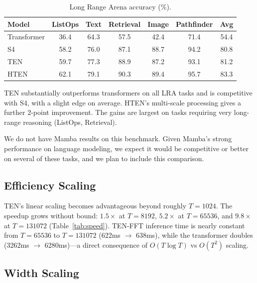 \documentclass{article}
\begin{document}
\begin{table}[h]
\centering
\caption{Long Range Arena accuracy (\%).}
\label{tab:lra}
\begin{tabular}{lcccccc}
\toprule
Model & ListOps & Text & Retrieval & Image & Pathfinder & Avg \\
\midrule
Transformer & 36.4 & 64.3 & 57.5 & 42.4 & 71.4 & 54.4 \\
S4 & 58.2 & 76.0 & 87.1 & 88.7 & 94.2 & 80.8 \\
TEN & 59.7 & 77.3 & 88.9 & 87.2 & 93.1 & 81.2 \\
HTEN & 62.1 & 79.1 & 90.3 & 89.4 & 95.7 & 83.3 \\
\bottomrule
\end{tabular}
\end{table}

TEN substantially outperforms transformers on all LRA tasks and is competitive with S4, with a slight edge on average. HTEN's multi-scale processing gives a further 2-point improvement. The gains are largest on tasks requiring very long-range reasoning (ListOps, Retrieval).

We do not have Mamba results on this benchmark. Given Mamba's strong performance on language modeling, we expect it would be competitive or better on several of these tasks, and we plan to include this comparison.

\subsection{Efficiency Scaling}

TEN's linear scaling becomes advantageous beyond roughly $T = 1024$. The speedup grows without bound: $1.5\times$ at $T = 8192$, $5.2\times$ at $T = 65536$, and $9.8\times$ at $T = 131072$ (Table~\ref{tab:speed}). TEN-FFT inference time is nearly constant from $T = 65536$ to $T = 131072$ (622ms $\to$ 638ms), while the transformer doubles (3262ms $\to$ 6280ms)---a direct consequence of $O(T \log T)$ vs $O(T^2)$ scaling.

\subsection{Width Scaling}
\end{document}
